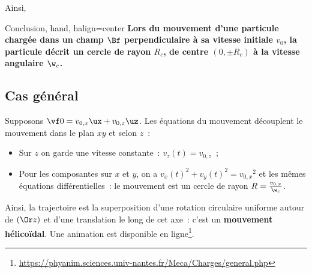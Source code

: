 \documentclass[../main/main.tex]{subfiles}
\begin{document}
Ainsi,
\begin{tror}{Conclusion, hand, halign=center}
    \bfseries
    Lors du mouvement d'une particule chargée dans un champ $\Bf$
    perpendiculaire à sa vitesse initiale $v_0$, la particule décrit un cercle de
    rayon $R_c$, de centre $(0,\pm R_c)$ à la vitesse angulaire $\w_c$.
\end{tror}

\subsection{Cas général}
Supposons $\vf0 = v_{0,x}\ux + v_{0,z}\uz$. Les équations du mouvement
découplent le mouvement dans le plan $xy$ et selon $z$~:
\begin{itemize}
    \item Sur $z$ on garde une vitesse constante~: $v_z(t) = v_{0,z}$~;
    \item Pour les composantes sur $x$ et $y$, on a $v_x(t)^2 + v_y(t)^2 =
        v_{0,x}{}^2$ et les mêmes équations différentielles~: le mouvement est
        un cercle de rayon $R = \frac{v_{0,x}}{\w_c}$.
\end{itemize}
Ainsi, la trajectoire est la superposition d'une rotation circulaire uniforme
autour de $(\Or z)$ et d'une translation le long de cet axe~: c'est un
\textbf{mouvement hélicoïdal}. Une animation est disponible en
ligne\footnote{\url{https://phyanim.sciences.univ-nantes.fr/Meca/Charges/general.php}}.
\end{document}
